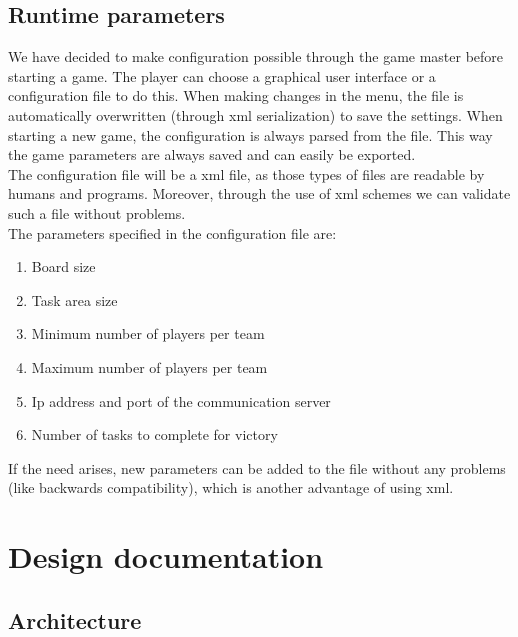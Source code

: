 \documentclass[11pt,a4paper]{article}
\begin{document}
\subsection{Runtime parameters}


We have decided to make configuration possible through the game master before starting a game. The player can choose a graphical user interface or a configuration file to do this. When making changes in the menu, the file is automatically overwritten (through xml serialization) to save the settings. When starting a new game, the configuration is always parsed from the file. This way the game parameters are always saved and can easily be exported. \\
The configuration file will be a xml file, as those types of files are readable by humans and programs. Moreover, through the use of xml schemes we can validate such a file without problems. \\
The parameters specified in the configuration file are:
\begin{enumerate}
\item Board size
\item Task area size
\item Minimum number of players per team
\item Maximum number of players per team
\item Ip address and port of the communication server
\item Number of tasks to complete for victory
\end{enumerate}
If the need arises, new parameters can be added to the file without any problems (like backwards compatibility), which is another advantage of using xml.

\section{Design documentation}

\subsection{Architecture}
\end{document}

